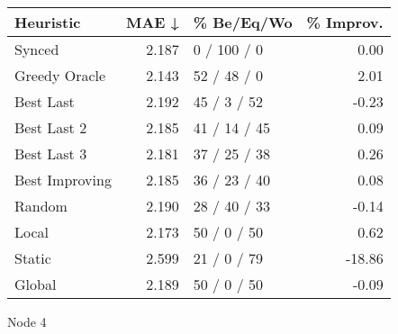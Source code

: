\begin{tabular}{lrlr}
\toprule
\textbf{Heuristic} & \textbf{MAE ↓} & \textbf{\% Be/Eq/Wo} & \textbf{\% Improv.} \\
\midrule
            Synced &          2.187 &          0 / 100 / 0 &                0.00 \\
     Greedy Oracle &          2.143 &          52 / 48 / 0 &                2.01 \\
         Best Last &          2.192 &          45 / 3 / 52 &               -0.23 \\
       Best Last 2 &          2.185 &         41 / 14 / 45 &                0.09 \\
       Best Last 3 &          2.181 &         37 / 25 / 38 &                0.26 \\
    Best Improving &          2.185 &         36 / 23 / 40 &                0.08 \\
            Random &          2.190 &         28 / 40 / 33 &               -0.14 \\
             Local &          2.173 &          50 / 0 / 50 &                0.62 \\
            Static &          2.599 &          21 / 0 / 79 &              -18.86 \\
            Global &          2.189 &          50 / 0 / 50 &               -0.09 \\
\bottomrule
\end{tabular}
\caption{Node 4}
\label{tab:hr_iid_lr01_le2_bs4_4}
